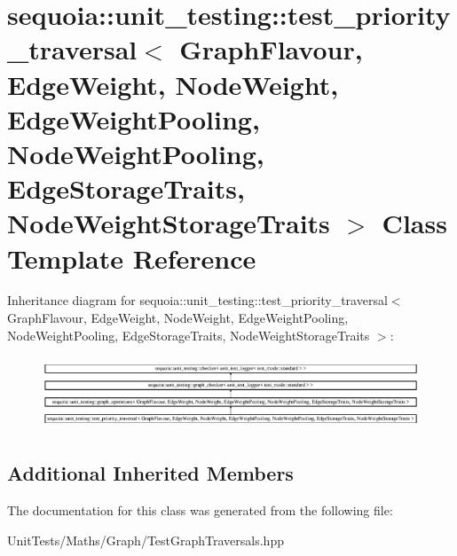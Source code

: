 \hypertarget{classsequoia_1_1unit__testing_1_1test__priority__traversal}{}\section{sequoia\+::unit\+\_\+testing\+::test\+\_\+priority\+\_\+traversal$<$ Graph\+Flavour, Edge\+Weight, Node\+Weight, Edge\+Weight\+Pooling, Node\+Weight\+Pooling, Edge\+Storage\+Traits, Node\+Weight\+Storage\+Traits $>$ Class Template Reference}
\label{classsequoia_1_1unit__testing_1_1test__priority__traversal}
Inheritance diagram for sequoia\+::unit\+\_\+testing\+::test\+\_\+priority\+\_\+traversal$<$ Graph\+Flavour, Edge\+Weight, Node\+Weight, Edge\+Weight\+Pooling, Node\+Weight\+Pooling, Edge\+Storage\+Traits, Node\+Weight\+Storage\+Traits $>$\+:\begin{figure}[H]
\begin{center}
\leavevmode
\includegraphics[height=2.198234cm]{classsequoia_1_1unit__testing_1_1test__priority__traversal}
\end{center}
\end{figure}
\subsection*{Additional Inherited Members}


The documentation for this class was generated from the following file\+:\begin{DoxyCompactItemize}
\item 
Unit\+Tests/\+Maths/\+Graph/Test\+Graph\+Traversals.\+hpp\end{DoxyCompactItemize}

